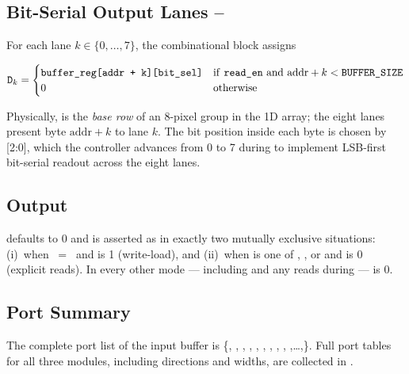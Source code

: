 \subsection{Bit-Serial Output Lanes --}
\label{sec:rtl-buffer-bitserial}

For each lane \(k \in \{0,\ldots,7\}\), the combinational block assigns

\[
    \texttt{D}_k =
    \begin{cases}
        \texttt{buffer\_reg[addr + k][bit\_sel]} &
        \text{if \texttt{read\_en} and \(\text{addr}+k < \texttt{BUFFER\_SIZE}\)} \\
        0 & \text{otherwise}
    \end{cases}
\]

Physically,  is the \emph{base row} of an 8-pixel
group in the 1D array; the eight lanes present byte
\(\text{addr}{+}k\) to lane \(k\). The bit position inside each byte is
chosen by [2:0], which the controller advances from 0
to 7 during  to implement LSB-first bit-serial
readout across the eight lanes.

\subsection{ Output}
\label{sec:rtl-buffer-ready}

 defaults to 0 and is asserted as 
in exactly two mutually exclusive situations: (i)~when
~=~ and 
is 1 (write-load), and (ii)~when  is one of
, , or 
and  is 0 (explicit reads). In every other
mode --- including  and any reads during
 ---  is 0.

\subsection{Port Summary}
\label{sec:rtl-buffer-ports}

The complete port list of the input buffer is
\{, , , ,
, , ,
, ,
,\ldots,\}.
Full port tables for all three modules, including directions and widths,
are collected in .
